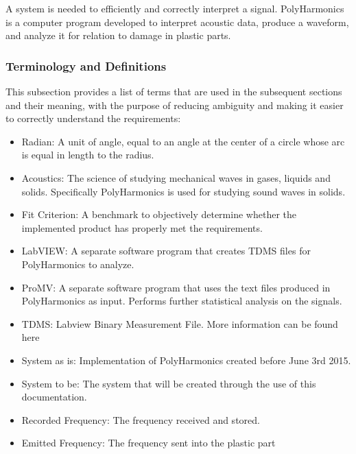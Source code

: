 \documentclass[12pt]{article}
\newcommand{\progname}{PolyHarmonics}
\begin{document}
A system is needed to efficiently and correctly interpret a signal. \progname{}
is a computer program developed to interpret acoustic data, produce a
waveform, and analyze it for relation to damage in plastic parts.


\subsubsection{Terminology and  Definitions}

This subsection provides a list of terms that are used in the subsequent
sections and their meaning, with the purpose of reducing ambiguity and making it
easier to correctly understand the requirements:

\begin{itemize}

\item Radian: A unit of angle, equal to an angle at the center of a circle whose
  arc is equal in length to the radius.
\item Acoustics: The science of studying mechanical waves in gases, liquids and
  solids. Specifically \progname{} is used for studying sound waves in solids.
\item Fit Criterion: A benchmark to objectively determine whether the
  implemented product has properly met the requirements.
\item LabVIEW: A separate software program that creates TDMS files for 
\progname{} to analyze.
\item ProMV: A separate software program that uses the text files produced in
  \progname{} as input. Performs further statistical analysis on the signals.
\item TDMS: Labview Binary Measurement File. More information can be found here 
\cite{TDMS}\\
\item System as is: Implementation of PolyHarmonics created before June 3rd 
2015.
\item System to be: The system that will be created through the use of this 
documentation.
\item Recorded Frequency: The frequency received and stored.
\item Emitted Frequency: The frequency sent into the plastic part
\end{itemize}
\end{document}
